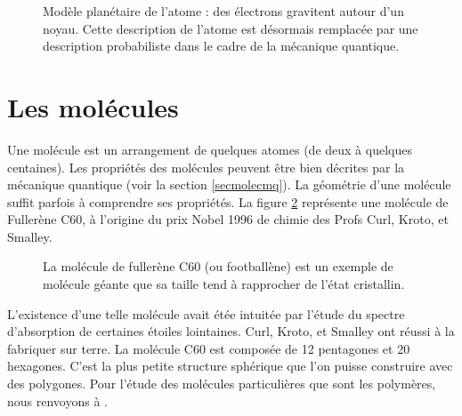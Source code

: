 \documentclass[12pt]{book}
\begin{document}
\begin{figure}[htb]
 \centerline{}   
 \caption{Mod\`ele plan\'etaire de l'atome : des \'electrons gravitent
autour d'un noyau. Cette description de l'atome est d\'esormais
remplac\'ee par une description probabiliste dans le cadre de la
m\'ecanique quantique.}
 \label{figatome}
\end{figure}

\section{Les mol\'ecules}
Une mol\'ecule\cite{ph:mecaq:Cohen73,ph:mecaq:Rivail89} est un
arrangement de quelques atomes (de deux \`a 
quelques centaines). Les propri\'et\'es des mol\'ecules peuvent
\^etre bien d\'ecrites par la m\'ecanique quantique (voir la section
\ref{secmolecmq}). La g\'eom\'etrie d'une
mol\'ecule suffit parfois \`a comprendre ses propri\'et\'es. La
figure \ref{figc60fig} repr\'esente une mol\'ecule de Fuller\`ene C60,
\`a l'origine du prix Nobel 1996 de chimie des Profs Curl, Kroto, et Smalley.
\begin{figure}[htb]
 \centerline{}   
 \caption{La mol\'ecule de fuller\`ene C60 (ou football\`ene) est un
exemple de mol\'ecule g\'eante que sa taille tend \`a  rapprocher de
l'\'etat cristallin.} 
 \label{figc60fig}
\end{figure}
L'existence d'une telle mol\'ecule avait \'et\'ee intuit\'ee par
l'\'etude du spectre d'absorption de certaines \'etoiles lointaines.
Curl, Kroto, et Smalley ont r\'eussi \`a la fabriquer sur terre.
La mol\'ecule C60 est compos\'ee de 12 pentagones et 20 hexagones.
C'est la plus petite structure sph\'erique que l'on puisse construire
avec des polygones.
Pour l'\'etude des mol\'ecules particuli\`eres que sont les
polym\`eres, nous renvoyons \`a \cite{ph:ploym:Doi96}.
\end{document}
